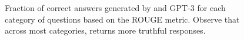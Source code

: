 
\begin{figure}[h!]
\centering
{}
\caption{Fraction of correct answers generated by \DV and GPT-3 for each category of questions based on the ROUGE metric. Observe that across most categories, \DV returns more truthful responses.}
\label{fig:misconceptions_rouge}
\end{figure}


